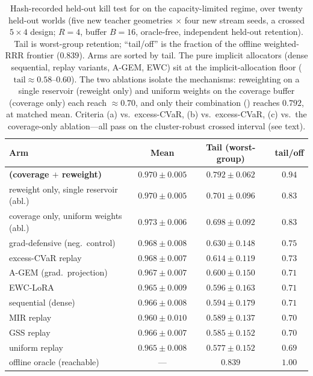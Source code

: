 \begin{table}[t]
\centering
\small
\caption{Hash-recorded held-out kill test for \method{} on the capacity-limited
regime, over twenty held-out worlds (five new teacher geometries $\times$ four new
stream seeds, a crossed $5\times4$ design; $R{=}4$, buffer $B{=}16$, oracle-free,
independent held-out retention). Tail is worst-group retention; ``tail/off'' is
the fraction of the offline weighted-RRR frontier ($0.839$). Arms are sorted by
tail. The pure implicit allocators (dense sequential, replay variants, A-GEM,
EWC) sit at the implicit-allocation floor ($\mathrm{tail}\approx0.58$--$0.60$).
The two ablations isolate the mechanisms: reweighting on a single reservoir
(reweight only) and uniform weights on the coverage buffer (coverage only) each
reach $\approx0.70$, and only their combination (\method{}) reaches $0.792$, at
matched mean. Criteria (a) vs.\ excess-CVaR, (b) vs.\ excess-CVaR, (c) vs.\ the
coverage-only ablation---all pass on the cluster-robust crossed interval (see
text).}
\label{tab:d2c}
\begin{tabular}{lccc}
\toprule
Arm & Mean & Tail (worst-group) & tail/off \\
\midrule
\textbf{\method{} (coverage $+$ reweight)} & $\mathbf{0.970\pm0.005}$ & $\mathbf{0.792\pm0.062}$ & $\mathbf{0.94}$ \\
\;\;reweight only, single reservoir (abl.)  & $0.970\pm0.005$ & $0.701\pm0.096$ & $0.83$ \\
\;\;coverage only, uniform weights (abl.)   & $0.973\pm0.006$ & $0.698\pm0.092$ & $0.83$ \\
\midrule
grad-defensive (neg.\ control)  & $0.968\pm0.008$ & $0.630\pm0.148$ & $0.75$ \\
excess-CVaR replay              & $0.968\pm0.007$ & $0.614\pm0.119$ & $0.73$ \\
A-GEM (grad.\ projection)       & $0.967\pm0.007$ & $0.600\pm0.150$ & $0.71$ \\
EWC-LoRA                        & $0.965\pm0.009$ & $0.596\pm0.163$ & $0.71$ \\
sequential (dense)              & $0.966\pm0.008$ & $0.594\pm0.179$ & $0.71$ \\
MIR replay                      & $0.960\pm0.010$ & $0.589\pm0.137$ & $0.70$ \\
GSS replay                      & $0.966\pm0.007$ & $0.585\pm0.152$ & $0.70$ \\
uniform replay                  & $0.965\pm0.008$ & $0.577\pm0.152$ & $0.69$ \\
\midrule
offline oracle (reachable)      & --- & $0.839$ & $1.00$ \\
\bottomrule
\end{tabular}
\end{table}

